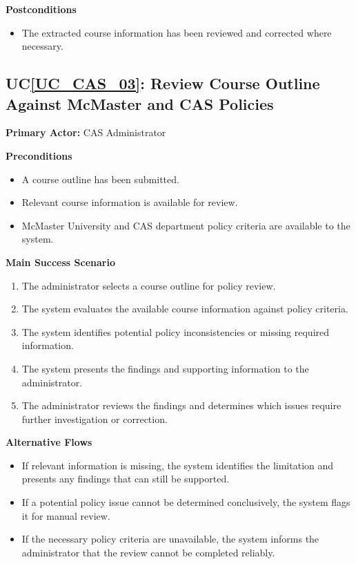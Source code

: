 \documentclass[12pt]{article}
\newcounter{ucnum} %
\newcommand{\ucref}[1]{UC\ref{#1}}
\begin{document}
\noindent \textbf{Postconditions}
\begin{itemize}
  \item The extracted course information has been reviewed and corrected where necessary.
\end{itemize}



 \label{UC_CAS_03}
\subsection{\ucref{UC_CAS_03}: Review Course Outline Against McMaster and CAS Policies}

\noindent \textbf{Primary Actor:} CAS Administrator

\noindent \textbf{Preconditions}
\begin{itemize}
  \item A course outline has been submitted.
  \item Relevant course information is available for review.
  \item McMaster University and CAS department policy criteria are available to the system.
\end{itemize}

\noindent \textbf{Main Success Scenario}
\begin{enumerate}
  \item The administrator selects a course outline for policy review.
  \item The system evaluates the available course information against policy criteria.
  \item The system identifies potential policy inconsistencies or missing required information.
  \item The system presents the findings and supporting information to the administrator.
  \item The administrator reviews the findings and determines which issues require further investigation or correction.
\end{enumerate}

\noindent \textbf{Alternative Flows}
\begin{itemize}
  \item If relevant information is missing, the system identifies the limitation and presents any findings that can still be supported.
  \item If a potential policy issue cannot be determined conclusively, the system flags it for manual review.
  \item If the necessary policy criteria are unavailable, the system informs the administrator that the review cannot be completed reliably.
\end{itemize}
\end{document}
